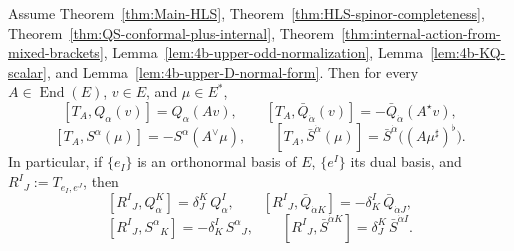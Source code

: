 \begin{corollary}
\label{cor:4b-contragredient-internal-action}
Assume Theorem~\ref{thm:Main-HLS},
Theorem~\ref{thm:HLS-spinor-completeness},
Theorem~\ref{thm:QS-conformal-plus-internal},
Theorem~\ref{thm:internal-action-from-mixed-brackets},
Lemma~\ref{lem:4b-upper-odd-normalization},
Lemma~\ref{lem:4b-KQ-scalar}, and
Lemma~\ref{lem:4b-upper-D-normal-form}. Then for every
\(A\in\operatorname{End}(E)\), \(v\in E\), and \(\mu\in E^*\),
\[
[T_A,Q_\alpha(v)]
=
Q_\alpha(Av),
\qquad
[T_A,\bar Q_{\dot\alpha}(v)]
=
-\bar Q_{\dot\alpha}(A^\star v),
\]
\[
[T_A,S^\alpha(\mu)]
=
-S^\alpha(A^\vee\mu),
\qquad
[T_A,\bar S^{\dot\alpha}(\mu)]
=
\bar S^{\dot\alpha}\bigl((A\mu^\sharp)^\flat\bigr).
\]
In particular, if \(\{e_I\}\) is an orthonormal basis of \(E\), \(\{e^I\}\) its
dual basis, and \(R^I{}_J:=T_{e_I,e^J}\), then
\[
[R^I{}_J,Q_\alpha^K]=\delta_J^K\,Q_\alpha^I,
\qquad
[R^I{}_J,\bar Q_{\dot\alpha K}]
=
-\delta_K^I\,\bar Q_{\dot\alpha J},
\]
\[
[R^I{}_J,S^\alpha{}_K]
=
-\delta_K^I\,S^\alpha{}_J,
\qquad
[R^I{}_J,\bar S^{\dot\alpha K}]
=
\delta_J^K\,\bar S^{\dot\alpha I}.
\]
\end{corollary}

